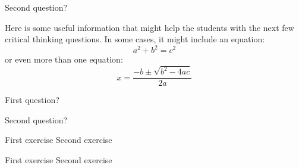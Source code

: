 \begin{activity}
\begin{ctqs}
	\question Second question?
	
		\answerspace{1in}
\end{ctqs}

		
\begin{infobox}
	Here is some useful information that might help the students with the next few critical thinking questions.
	In some cases, it might include an equation:
	\begin{equation*}
		a^2 + b^2 = c^2
	\end{equation*}
	or even more than one equation:
	\begin{equation*}
		x=\frac{-b \pm \sqrt{b^2-4ac}}{2a}
	\end{equation*}
\end{infobox}

\begin{ctqs}

	\question First question?
	
		\answerspace{1in}		
	
	\question Second question?
	
		\answerspace{1in}
\end{ctqs}



\begin{exercises}

	\exercise First exercise
	\exercise Second exercise
	
\end{exercises}


\begin{problems}

	\problem First exercise
	\problem Second exercise
	
\end{problems}


	
\end{activity}